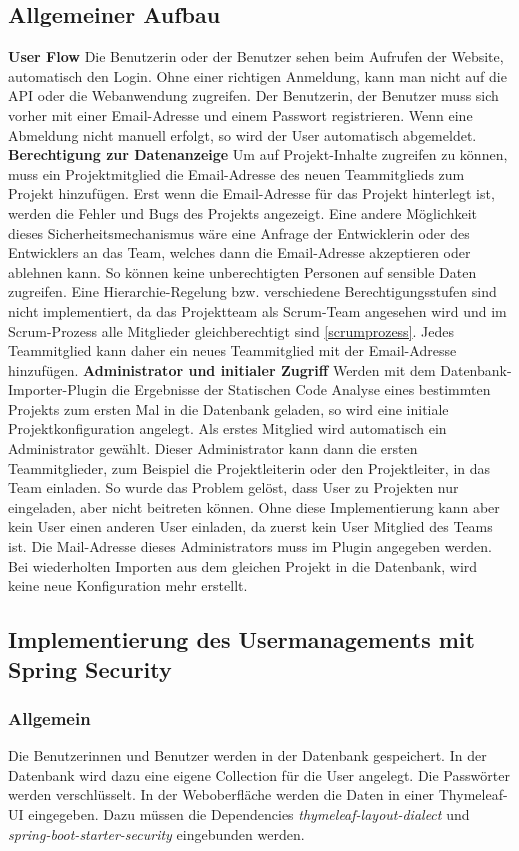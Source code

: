 \subsection{Allgemeiner Aufbau} 
\textbf{User Flow}
Die Benutzerin oder der Benutzer sehen beim Aufrufen der Website, automatisch den Login. Ohne einer richtigen Anmeldung, kann man nicht auf die API oder die Webanwendung zugreifen. Der Benutzerin, der Benutzer muss sich vorher mit einer Email-Adresse und einem Passwort registrieren. Wenn eine Abmeldung nicht manuell erfolgt, so wird der User automatisch abgemeldet.
\textbf{Berechtigung zur Datenanzeige}
Um auf Projekt-Inhalte zugreifen zu können, muss ein Projektmitglied die Email-Adresse des neuen Teammitglieds zum Projekt hinzufügen. Erst wenn die Email-Adresse für das Projekt hinterlegt ist, werden die Fehler und Bugs des Projekts angezeigt. Eine andere Möglichkeit dieses Sicherheitsmechanismus wäre eine Anfrage der Entwicklerin oder des Entwicklers an das Team, welches dann die Email-Adresse akzeptieren oder ablehnen kann. So können keine unberechtigten Personen auf sensible Daten zugreifen. Eine Hierarchie-Regelung bzw. verschiedene Berechtigungsstufen sind nicht implementiert, da das Projektteam als Scrum-Team angesehen wird und im Scrum-Prozess alle Mitglieder gleichberechtigt sind \ref{scrumprozess}. Jedes Teammitglied kann daher ein neues Teammitglied mit der Email-Adresse hinzufügen.
\textbf{Administrator und initialer Zugriff}
Werden mit dem Datenbank-Importer-Plugin die Ergebnisse der Statischen Code Analyse eines bestimmten Projekts zum ersten Mal in die Datenbank geladen, so wird eine initiale Projektkonfiguration angelegt. Als erstes Mitglied wird automatisch ein Administrator gewählt. Dieser Administrator kann dann die ersten Teammitglieder, zum Beispiel die Projektleiterin oder den Projektleiter, in das Team einladen. So wurde das Problem gelöst, dass User zu Projekten nur eingeladen, aber nicht beitreten können. Ohne diese Implementierung kann aber kein User einen anderen User einladen, da zuerst kein User Mitglied des Teams ist. Die Mail-Adresse dieses Administrators muss im Plugin angegeben werden. Bei wiederholten Importen aus dem gleichen Projekt in die Datenbank, wird keine neue Konfiguration mehr erstellt.

\subsection{Implementierung des Usermanagements mit Spring Security}
\subsubsection{Allgemein}
Die Benutzerinnen und Benutzer werden in der Datenbank gespeichert. In der Datenbank wird dazu eine eigene Collection für die User angelegt. Die Passwörter werden verschlüsselt. In der Weboberfläche werden die Daten in einer Thymeleaf-UI eingegeben. Dazu müssen die Dependencies \textit{thymeleaf-layout-dialect} und \textit{spring-boot-starter-security} eingebunden werden. 
